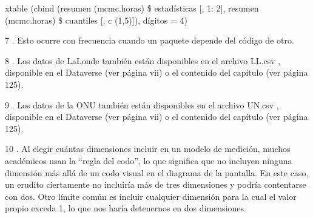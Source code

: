 \documentclass[
]{book}
\begin{document}
xtable (cbind (resumen (mcmc.horas) \$ estadísticas {[}, 1: 2{]}, resumen (mcmc.horas) \$ cuantiles {[}, c (1,5){]}), dígitos = 4)

7 .
Esto ocurre con frecuencia cuando un paquete depende del código de otro.

8 .
Los datos de LaLonde también están disponibles en el archivo LL.csv , disponible en el Dataverse (ver página vii) o el contenido del capítulo (ver página 125).

9 .
Los datos de la ONU también están disponibles en el archivo UN.csv , disponible en el Dataverse (ver página vii) o el contenido del capítulo (ver página 125).

10 .
Al elegir cuántas dimensiones incluir en un modelo de medición, muchos académicos usan la ``regla del codo'', lo que significa que no incluyen ninguna dimensión más allá de un codo visual en el diagrama de la pantalla. En este caso, un erudito ciertamente no incluiría más de tres dimensiones y podría contentarse con dos. Otro límite común es incluir cualquier dimensión para la cual el valor propio exceda 1, lo que nos haría detenernos en dos dimensiones.
\end{document}
